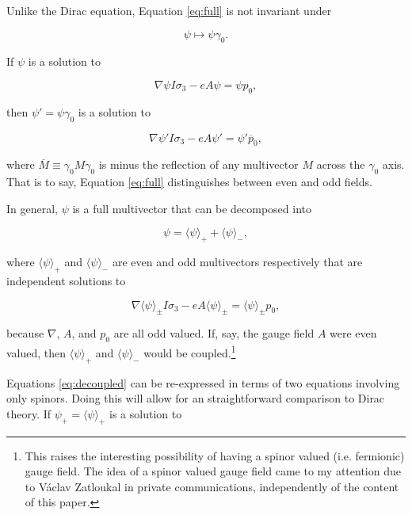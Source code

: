 \documentclass{article}
\begin{document}
  Unlike the Dirac equation, Equation \ref{eq:full} is not invariant under

  \begin{equation}
    \psi \mapsto \psi \gamma_0.\label{eq:g0conjugation}
  \end{equation}

  If $\psi$ is a solution to

  \begin{equation}
    \nabla \psi I \sigma_3 - e A \psi = \psi p_0,\label{eq:plus}
  \end{equation}

  then $\psi' = \psi \gamma_0$ is a solution to

  \begin{equation}
    \nabla \psi' I \sigma_3 - e A \psi' = \psi' \overline p_0, \label{eq:minus}
  \end{equation}

  where $\overline M \equiv \gamma_0 M\gamma_0$ is minus the reflection of any multivector $M$ across the $\gamma_0$ axis. That is to say, Equation \ref{eq:full} distinguishes between even and odd fields. 

  In general, $\psi$ is a full multivector that can be decomposed into

  \begin{equation}
    \psi = \langle \psi \rangle_+ + \langle \psi \rangle_-,
  \end{equation}

  where $\langle \psi \rangle_+$ and $\langle \psi \rangle_-$ are even and odd multivectors respectively that are independent solutions to

  \begin{equation}
    \nabla \langle \psi \rangle_\pm I \sigma_3 - e A \langle \psi \rangle_\pm = \langle \psi \rangle_\pm p_0,\label{eq:decoupled}
  \end{equation}

  because $\nabla$, $A$, and $p_0$ are all odd valued. If, say, the gauge field $A$ were even valued, then $\langle \psi \rangle_+$ and $\langle \psi \rangle_-$ would be coupled.\footnote{This raises the interesting possibility of having a spinor valued (i.e. fermionic) gauge field. The idea of a spinor valued gauge field came to my attention due to V\'aclav Zatloukal in private communications, independently of the content of this paper.}

  Equations \ref{eq:decoupled} can be re-expressed in terms of two equations involving only spinors. Doing this will allow for an straightforward comparison to Dirac theory. If $\psi_+ = \langle \psi \rangle_+$ is a solution to
\end{document}
